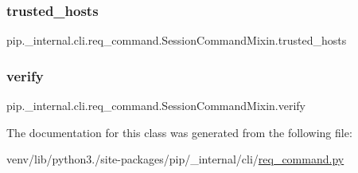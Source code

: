 \subsubsection{\texorpdfstring{trusted\+\_\+hosts}{trusted\_hosts}}
{\footnotesize\ttfamily pip.\+\_\+internal.\+cli.\+req\+\_\+command.\+Session\+Command\+Mixin.\+trusted\+\_\+hosts\hspace{0.3cm}{\ttfamily [static]}}

\mbox{\label{classpip_1_1__internal_1_1cli_1_1req__command_1_1SessionCommandMixin_a77f57eec02c6813ccd5496ae93ea96f9}} 
\subsubsection{\texorpdfstring{verify}{verify}}
{\footnotesize\ttfamily pip.\+\_\+internal.\+cli.\+req\+\_\+command.\+Session\+Command\+Mixin.\+verify\hspace{0.3cm}{\ttfamily [static]}}



The documentation for this class was generated from the following file\+:\begin{DoxyCompactItemize}
\item 
venv/lib/python3./site-\/packages/pip/\+\_\+internal/cli/\hyperlink{req__command_8py}{req\+\_\+command.\+py}\end{DoxyCompactItemize}

